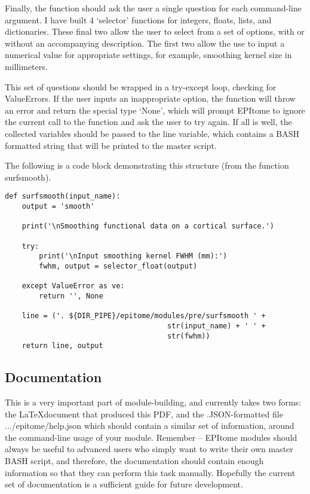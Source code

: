 \documentclass[final,titlepage,letterpaper,oneside,12pt]{article}
\renewcommand{\texttt}[2][BrickRed]{\textcolor{#1}{\ttfamily #2}}%
\begin{document}
Finally, the function should ask the user a single question for each command-line argument. I have built 4 `selector' functions for integers, floats, lists, and dictionaries. These final two allow the user to select from a set of options, with or without an accompanying description. The first two allow the use to input a numerical value for appropriate settings, for example, smoothing kernel size in millimeters.

This set of questions should be wrapped in a try-except loop, checking for ValueErrors. If the user inputs an inappropriate option, the function will throw an error and return the special type `None', which will prompt EPItome to ignore the current call to the function and ask the user to try again. If all is well, the collected variables should be passed to the \texttt{line} variable, which contains a BASH formatted string that will be printed to the master script.

The following is a code block demonstrating this structure (from the function \texttt{surfsmooth}).

\begin{lstlisting}
def surfsmooth(input_name):    
    output = 'smooth'

    print('\nSmoothing functional data on a cortical surface.')

    try:
        print('\nInput smoothing kernel FWHM (mm):')
        fwhm, output = selector_float(output)

    except ValueError as ve:
        return '', None

    line = ('. ${DIR_PIPE}/epitome/modules/pre/surfsmooth ' +
                                      str(input_name) + ' ' +
                                      str(fwhm))
    return line, output
\end{lstlisting}

\subsection{Documentation}

This is a very important part of module-building, and currently takes two forms: the \LaTeX document that produced this PDF, and the .JSON-formatted file \texttt{.../epitome/help.json} which should contain a similar set of information, around the command-line usage of your module. Remember -- EPItome modules should always be useful to advanced users who simply want to write their own master BASH script, and therefore, the documentation should contain enough information so that they can perform this task manually. Hopefully the current set of documentation is a sufficient guide for future development.

\newpage 


\end{document}
